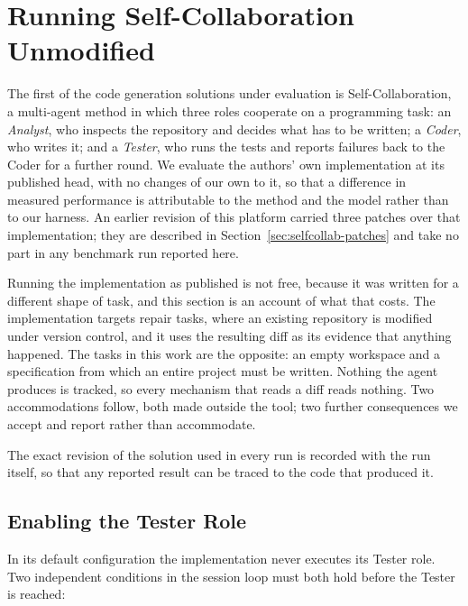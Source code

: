 
\section{Running Self-Collaboration Unmodified}

The first of the code generation solutions under evaluation is
Self-Collaboration, a multi-agent method in which three roles cooperate on a
programming task: an \emph{Analyst}, who inspects the repository and decides
what has to be written; a \emph{Coder}, who writes it; and a \emph{Tester}, who
runs the tests and reports failures back to the Coder for a further round. We
evaluate the authors' own implementation at its published head, with no changes
of our own to it, so that a difference in measured performance is attributable
to the method and the model rather than to our harness. An earlier revision of
this platform carried three patches over that implementation; they are
described in Section~\ref{sec:selfcollab-patches} and take no part in any
benchmark run reported here.

Running the implementation as published is not free, because it was written for
a different shape of task, and this section is an account of what that costs.
The implementation targets repair tasks, where an existing repository is
modified under version control, and it uses the resulting diff as its evidence
that anything happened. The tasks in this work are the opposite: an empty
workspace and a specification from which an entire project must be written.
Nothing the agent produces is tracked, so every mechanism that reads a diff
reads nothing. Two accommodations follow, both made outside the tool; two
further consequences we accept and report rather than accommodate.

The exact revision of the solution used in every run is recorded with the run
itself, so that any reported result can be traced to the code that produced it.

\subsection{Enabling the Tester Role}

In its default configuration the implementation never executes its Tester role.
Two independent conditions in the session loop must both hold before the Tester
is reached:

